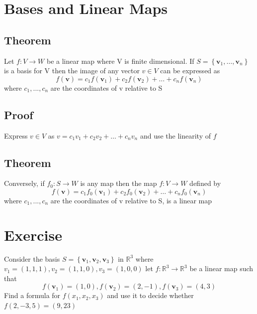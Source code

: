 \documentclass{article}[18pt]
\begin{document}
\section{Bases and Linear Maps}
\subsection{Theorem}
Let $f:V\rightarrow W$ be a linear map where V is finite dimensional. If  $S = \left\{ \mathbf { v } _ { 1 } , \dots , \mathbf { v } _ { n } \right\}$ is a basis for V then the image of any vector $v\in V$ can be expressed as
$$f ( \mathbf { v } ) = c _ { 1 } f \left( \mathbf { v } _ { 1 } \right) + c _ { 2 } f \left( \mathbf { v } _ { 2 } \right) + \ldots + c _ { n } f \left( \mathbf { v } _ { n } \right)$$
where $c_1,...,c_n$ are the coordinates of v relative to S
\subsection{Proof}
Express $v \in V$ as $v = c _ { 1 } v _ { 1 } + c _ { 2 } v _ { 2 } + \dots + c _ { n } v _ { n }$ and use the linearity of $f$
\subsection{Theorem}
Conversely, if $f_0: S\rightarrow W$ is any map then the map $f:V\rightarrow W$ defined by
$$f ( \mathbf { v } ) = c _ { 1 } f _ { 0 } \left( \mathbf { v } _ { 1 } \right) + c _ { 2 } f _ { 0 } \left( \mathbf { v } _ { 2 } \right) + \ldots + c _ { n } f _ { 0 } \left( \mathbf { v } _ { n } \right)$$
where $c_1,...,c_n$ are the coordinates of v relative to S, is a linear map
\section{Exercise}
Consider the basis $S = \left\{ \mathbf { v } _ { 1 } , \mathbf { v } _ { 2 } , \mathbf { v } _ { 3 } \right\}$ in $\mathbb{R}^3$ where $v_1=(1,1,1), v_2=(1,1,0), v_3=(1,0,0)$ let $f: \mathbb{R}^3\rightarrow \mathbb{R}^3$ be a linear map such that
$$f \left( \mathbf { v } _ { 1 } \right) = ( 1,0 ) , f \left( \mathbf { v } _ { 2 } \right) = ( 2 , - 1 ) , f \left( \mathbf { v } _ { 3 } \right) = ( 4,3 )$$
Find a formula for $f(x_1,x_2,x_3)$ and use it to decide whether $f(2,-3,5)=(9,23)$
\end{document}
